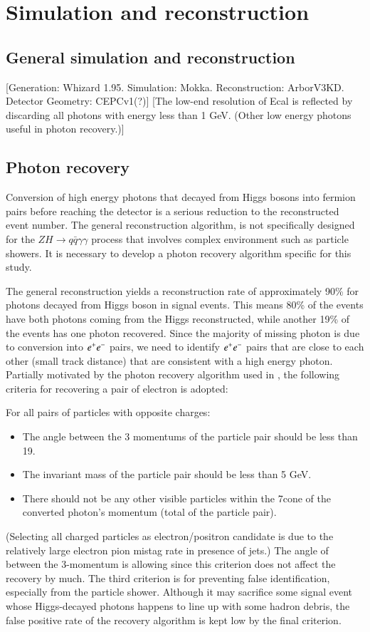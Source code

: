\documentclass[11pt,a4paper]{cepcnote}
\begin{document}
\section{Simulation and reconstruction}
\label{sec:sim}
\subsection{General simulation and reconstruction}
[Generation: Whizard 1.95. Simulation: Mokka. Reconstruction: ArborV3KD. Detector Geometry: CEPCv1(?)]
[The low-end resolution of Ecal is reflected by discarding all photons with energy less than 1 GeV. (Other low energy photons useful in photon recovery.)]

\subsection{Photon recovery}
Conversion of high energy photons that decayed from Higgs bosons into fermion pairs before reaching the detector is a serious reduction to the reconstructed event number. The general reconstruction algorithm, is not specifically designed for the $ZH\rightarrow q\bar q\gamma\gamma$ process that involves complex environment such as particle showers. It is necessary to develop a photon recovery algorithm specific for this study.

The general reconstruction yields a reconstruction rate of approximately 90\% for photons decayed from Higgs boson in signal events. This means 80\% of the events have both photons coming from the Higgs reconstructed, while another 19\% of the events has one photon recovered.
Since the majority of missing photon is due to conversion into $e^+ e^-$ pairs, we need to identify $e^+ e^-$ pairs that are close to each other (small track distance) that are consistent with a high energy photon. Partially motivated by the photon recovery algorithm used in \cite{Boos:2000bz}, the following criteria for recovering a pair of electron is adopted:

For all pairs of particles with opposite charges:
\begin{itemize}
\item The angle between the 3 momentums of the particle pair should be less than 19\textdegree.
\item The invariant mass of the particle pair should be less than 5 GeV.
\item There should not be any other visible particles within the 7\textdegree cone of the converted photon's momentum (total of the particle pair).
\end{itemize}
(Selecting all charged particles as electron/positron candidate is due to the relatively large electron pion mistag rate in presence of jets.) The angle of between the 3-momentum is allowing since this criterion does not affect the recovery by much. The third criterion is for preventing false identification, especially from the particle shower. Although it may sacrifice some signal event whose Higgs-decayed photons happens to line up with some hadron debris, the false positive rate of the recovery algorithm is kept low by the final criterion.
\end{document}

